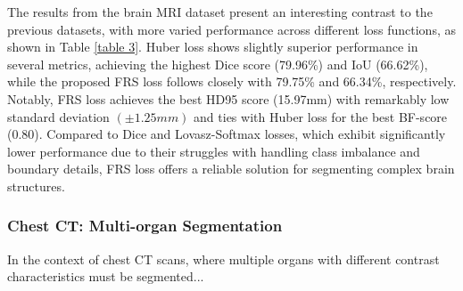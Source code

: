\documentclass[review]{elsarticle}
\begin{document}
The results from the brain MRI dataset present an interesting contrast to the previous datasets, with more varied performance across different loss functions, as shown in Table \ref{table 3}. Huber loss shows slightly superior performance in several metrics, achieving the highest Dice score (79.96\%) and IoU (66.62\%), while the proposed FRS loss follows closely with 79.75\% and 66.34\%, respectively. Notably, FRS loss achieves the best HD95 score (15.97mm) with remarkably low standard deviation \((\pm1.25mm)\) and ties with Huber loss for the best BF-score (0.80). Compared to Dice and Lovasz-Softmax losses, which exhibit significantly lower performance due to their struggles with handling class imbalance and boundary details, FRS loss offers a reliable solution for segmenting complex brain structures.

\subsubsection{Chest CT: Multi-organ Segmentation}
In the context of chest CT scans, where multiple organs with different contrast characteristics must be segmented...
\end{document}
